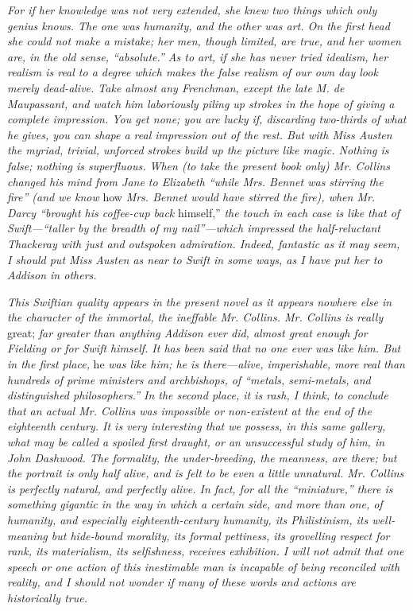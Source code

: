 \textit{For if her knowledge was not very extended, she knew two things which only genius knows. The one was humanity, and the other was art. On the first head she could not make a mistake; her men, though limited, are true, and her women are, in the old sense, ``absolute.'' As to art, if she has never tried idealism, her realism is real to a degree which makes the false realism of our own day look merely dead-alive. Take almost any Frenchman, except the late M. de Maupassant, and watch him laboriously piling up strokes in the hope of giving a complete impression. You get none; you are lucky if, discarding two-thirds of what he gives, you can shape a real impression out of the rest. But with Miss Austen the myriad, trivial, unforced strokes build up the picture like magic. Nothing is false; nothing is superfluous. When (to take the present book only) Mr. Collins changed his mind from Jane to Elizabeth ``while Mrs. Bennet was stirring the fire'' (and we know} how \textit{Mrs. Bennet would have stirred the fire), when Mr. Darcy ``brought his coffee-cup back} himself,'' \textit{the touch in each case is like that of Swift---``taller by the breadth of my nail''---which impressed the half-reluctant Thackeray with just and outspoken admiration. Indeed, fantastic as it may seem, I should put Miss Austen as near to Swift in some ways, as I have put her to Addison in others.}

\textit{This Swiftian quality appears in the present novel as it appears nowhere else in the character of the immortal, the ineffable Mr. Collins. Mr. Collins is really} great; \textit{far greater than anything Addison ever did, almost great enough for Fielding or for Swift himself. It has been said that no one ever was like him. But in the first place,} he \textit{was like him; he is there---alive, imperishable, more real than hundreds of prime ministers and archbishops, of ``metals, semi-metals, and distinguished philosophers.'' In the second place, it is rash, I think, to conclude that an actual Mr. Collins was impossible or non-existent at the end of the eighteenth century. It is very interesting that we possess, in this same gallery, what may be called a spoiled first draught, or an unsuccessful study of him, in John Dashwood. The formality, the under-breeding, the meanness, are there; but the portrait is only half alive, and is felt to be even a little unnatural. Mr. Collins is perfectly natural, and perfectly alive. In fact, for all the ``miniature,'' there is something gigantic in the way in which a certain side, and more than one, of humanity, and especially eighteenth-century humanity, its Philistinism, its well-meaning but hide-bound morality, its formal pettiness, its grovelling respect for rank, its materialism, its selfishness, receives exhibition. I will not admit that one speech or one action of this inestimable man is incapable of being reconciled with reality, and I should not wonder if many of these words and actions are historically true.}

